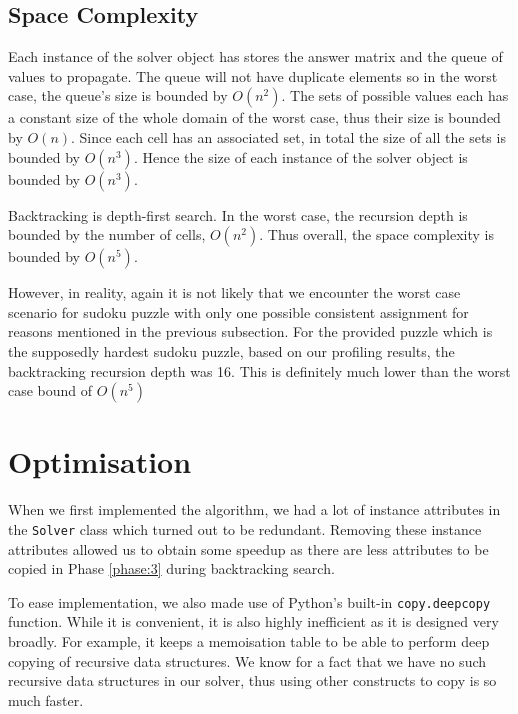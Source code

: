 \documentclass[11pt, a4paper]{article}
\begin{document}
\subsection{Space Complexity}
Each instance of the solver object has stores the answer matrix and the queue of values to propagate.
The queue will not have duplicate elements so in the worst case, the queue's size is bounded by $O(n^2)$.
The sets of possible values each has a constant size of the whole domain of the worst case, thus their size is bounded by $O(n)$.
Since each cell has an associated set, in total the size of all the sets is bounded by $O(n^3)$.
Hence the size of each instance of the solver object is bounded by $O(n^3)$.

Backtracking is depth-first search.
In the worst case, the recursion depth is bounded by the number of cells, $O(n^2)$.
Thus overall, the space complexity is bounded by $O(n^5)$.

However, in reality, again it is not likely that we encounter the worst case scenario for sudoku puzzle with only one possible consistent assignment for reasons mentioned in the previous subsection.
For the provided puzzle which is the supposedly hardest sudoku puzzle, based on our profiling results, the backtracking recursion depth was 16.
This is definitely much lower than the worst case bound of $O(n^5)$


\section{Optimisation}
When we first implemented the algorithm, we had a lot of instance attributes in the \texttt{Solver} class which turned out to be redundant.
Removing these instance attributes allowed us to obtain some speedup as there are less attributes to be copied in Phase \ref{phase:3} during backtracking search.

To ease implementation, we also made use of Python's built-in \texttt{copy.deepcopy} function.
While it is convenient, it is also highly inefficient as it is designed very broadly.
For example, it keeps a memoisation table to be able to perform deep copying of recursive data structures.
We know for a fact that we have no such recursive data structures in our solver, thus using other constructs to copy is so much faster.
\end{document}
